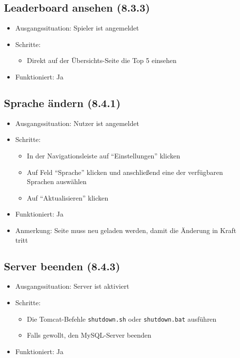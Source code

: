 \documentclass[a4paper]{scrreprt}
\begin{document}
            \subsection{Leaderboard ansehen (8.3.3)}
            \begin{itemize}
                \item Ausgangssituation: Spieler ist angemeldet
                \item Schritte:
                    \begin{itemize}
                        \item Direkt auf der Übersichts-Seite die Top 5 einsehen
                    \end{itemize}
                \item Funktioniert: Ja
            \end{itemize}

            \subsection{Sprache ändern (8.4.1)}
            \begin{itemize}
                \item Ausgangssituation: Nutzer ist angemeldet
                \item Schritte:
                    \begin{itemize}
                        \item In der Navigationsleiste auf \enquote{Einstellungen} klicken
                        \item Auf Feld \enquote{Sprache} klicken und anschließend eine der verfügbaren Sprachen auswählen
                        \item Auf \enquote{Aktualisieren} klicken
                    \end{itemize}
                \item Funktioniert: Ja
                \item Anmerkung: Seite muss neu geladen werden, damit die Änderung in Kraft tritt
            \end{itemize}

            \subsection{Server beenden (8.4.3)}
            \begin{itemize}
                \item Ausgangssituation: Server ist aktiviert
                \item Schritte:
                    \begin{itemize}
                        \item Die Tomcat-Befehle \texttt{shutdown.sh} oder \texttt{shutdown.bat} ausführen
                        \item Falls gewollt, den MySQL-Server beenden
                    \end{itemize}
                \item Funktioniert: Ja
            \end{itemize}
\end{document}
